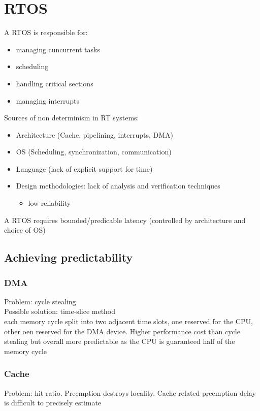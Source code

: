 \documentclass{book}
\begin{document}
\section{RTOS}
A RTOS is responsible for:\begin{itemize}
    \item managing cuncurrent tasks
    \item scheduling
    \item handling critical sections
    \item managing interrupts
\end{itemize}
Sources of non determinism in RT systems:
\begin{itemize}
    \item Architecture (Cache, pipelining, interrupts, DMA)
    \item OS (Scheduling, synchronization, communication)
    \item Language (lack of explicit support for time)
    \item Design methodologies: lack of analysis and verification techniques \begin{itemize}
        \item low reliability
    \end{itemize}
\end{itemize}

A RTOS requires bounded/predicable latency (controlled by architecture and choice of OS)
\subsection{Achieving predictability}
\subsubsection{DMA}
Problem: cycle stealing\\
Possible solution: time-slice method\\
each memory cycle split into two adjacent time slots, one reserved for the CPU, other oen reserved for the DMA device. Higher performance cost than cycle stealing but overall more predictable as the CPU is guaranteed half of the memory cycle
\subsubsection{Cache}
Problem: hit ratio. Preemption destroys locality. Cache related preemption delay is difficult to precisely estimate
\end{document}
